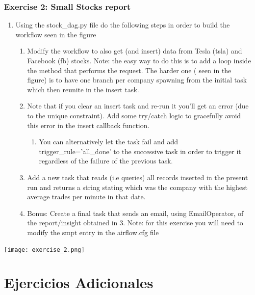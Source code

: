 \documentclass[leqno, 10pt, envcountsect]{beamer}
\numberwithin{equation}{section}
\theoremstyle{definition}
\theoremstyle{example}
\numberwithin{figure}{section}
\numberwithin{table}{section}
\let\olditem\item
\renewcommand{\item}{%
\olditem\vspace{1pt}}
\begin{document}
\begin{frame}[fragile=singleslide]
  \frametitle{Exercise 2: Small Stocks report}
  \begin{enumerate}
    \item Using the stock_dag.py file do the following steps in order to build the
workflow seen in the figure
    \begin{enumerate}
      \item Modify the workflow to also get (and insert) data from Tesla (tsla)
        and Facebook (fb) stocks. Note: the easy way to do this is to add a
        loop inside the method that performs the request. The harder one (
        seen in the figure) is to have one branch
        per company spawning from the initial task which then reunite in the
        insert task.
      \item Note that if you clear an insert task and re-run it you'll get an
        error (due to the unique constraint). Add some try/catch logic to
        gracefully avoid this error in the insert callback function.
        \begin{enumerate}
          \item You can alternatively let the task fail and add trigger_rule='all_done' to the
        successive task in order to trigger it regardless of the failure of the previous task.
        \end{enumerate}
      \item Add a new task that reads (i.e queries) all records inserted in the present run and returns a string stating which was the company with the highest average trades per minute in that date.

      \item Bonus: Create a final task that sends an email, using EmailOperator, of the
report/insight obtained in 3.  Note: for this exercise you will need to modify the
smpt entry in the airflow.cfg file
        \end{enumerate}
        \end{enumerate}
    \begin{center}
       \texttt{[image: exercise\_2.png]}
    \end{center}
\end{frame}

\section{Ejercicios Adicionales}
\label{sec:ejercicios_adicionales}
\end{document}
